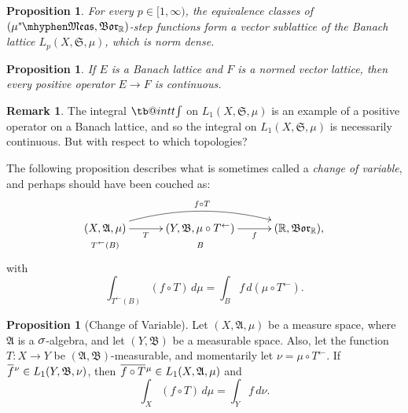 \documentclass[
twoside=true,
paper=letter,
fontsize=9pt,
pagesize=auto,
leqno,
openany,
headsepline,
overfullrule,
]{scrbook}
\makeatletter
\theoremstyle{plain}
\theoremstyle{plain}
\newtheorem{prop}[thm]{Proposition}
\theoremstyle{definition}
\newtheorem{rmk}[thm]{Remark}
\theoremstyle{bfnoteitalic}
\newtheorem{propboldnote}[thm]{Proposition}
\theoremstyle{bfnoteroman}
\newcommand{\sigalg}[1]{\mathfrak{#1}}
\newcommand{\borel}{\mathfrak{Bor}}
\newcommand{\textsigma}{\hbox{\large{$\sigma$}}\kern-1pt}
\newcommand{\preimage}[1]{#1^{\leftarrow}}
\newcommand{\R}{\mathbb{R}}
\newcommand{\semiring}{\sigalg{S}}
\newcommand{\sigmaalgebra}{\sigalg{A}}
\newcommand{\sigmaalgebraii}{\sigalg{B}}
\newcommand{\measurable}[1]{{#1}\mhyphen\mathfrak{Meas}}
\newcommand{\kernast}{\ast\kern-1pt}
\newcommand{\function}{f}
\newcommand{\measurespace}{X}
\newcommand{\measurespaceii}{Y}
\newcommand{\measure}{\mu}
\newcommand{\measureii}{\nu}
\newcommand{\setii}{B}
\newcommand*\xbar[1]{%
   \hbox{%
     \vbox{%
       \hrule height 0.4pt %
       \kern0.4ex%
       \hbox{%
         \ensuremath{#1}%
       }%
     }%
   }%
}
\newcommand\tint{\mathop{\mathpalette\tb@int{t}}\!\int}
\newcommand\tb@int[2]{%
  \sbox\z@{$\m@th#1\int$}%
  \if#2t%
    \rlap{\hbox to\wd\z@{%
      \hfil
      \vrule width .35em height \dimexpr\ht\z@+1.4pt\relax depth -\dimexpr\ht\z@+1pt\relax
      \kern.05em %
    }}
  \else
    \rlap{\hbox to\wd\z@{%
      \vrule width .35em height -\dimexpr\dp\z@+1pt\relax depth \dimexpr\dp\z@+1.4pt\relax
      \hfil
    }}
  \fi
}
\newcommand{\lebclass}[1]{\hspace{.5pt}\xbar{#1}\hspace{0.5pt}}
\newcommand{\ellclass}[2]{\lebclass{#1}^{#2}}
\newcommand{\inducedint}{\tint}
\makeatother
\begin{document}
\begin{prop}\label{step_functions_dense}
For every $p\in [1, \infty)$, the equivalence classes of $(\measurable{\measure^\kernast}, \borel_\R)$-step functions form a vector sublattice of the Banach lattice $L_p(\measurespace, \semiring, \measure)$, which is norm dense.
\end{prop}



\begin{prop}\label{integral_continuous}
If $E$ is a Banach lattice and $F$ is a normed vector lattice, then every positive operator $E\to F$ is continuous.
\end{prop}



\begin{rmk}
The integral $\inducedint$ on $L_1(\measurespace, \semiring, \measure)$ is an example of a positive operator on a Banach lattice, and so the integral on $L_1(\measurespace, \semiring, \measure)$ is necessarily continuous. But with respect to which topologies?
\end{rmk}







The following proposition describes what is sometimes called a \emph{change of variable}, and perhaps should have been couched as:
\[
\xymatrix@R=0pt@C=30pt{ 
(\measurespace,\sigmaalgebra,\measure)
\ar[r]_-{T} \ar@/^16pt/[rr]^{f\circ T}
& (\measurespaceii,\sigmaalgebraii,\measure\circ\preimage{T})
\ar[r]_-{\function}
& (\R,\borel_\R), \\
\scriptstyle{\preimage{T}(\setii)} & \scriptstyle{\setii} & \\
}
\]
with
\[
\int_{\preimage{T}(\setii)} (\function\circ T) \, d\measure
= \int_\setii \function \, d (\measure\circ\preimage{T}).
\]


\begin{propboldnote}[Change of Variable]\label{change_of_variable}
Let $(\measurespace,\sigmaalgebra,\measure)$ be a measure space, where $\sigmaalgebra$ is a $\textsigma$-algebra, and let $(\measurespaceii, \sigmaalgebraii)$ be a measurable space.  Also, let the function $T:\measurespace\to\measurespaceii$ be $(\sigmaalgebra, \sigmaalgebraii)$\hyp{}measurable, and momentarily let 
$\measureii = \measure\circ\preimage{T}$.
If
$\ellclass{\function}{\measureii} 
\in L_1(\measurespaceii, \sigmaalgebraii, \measureii)$, 
then 
$\ellclass{\function\circ T}{\measure}
\in
L_1(\measurespace, \sigmaalgebra, \measure)$
and
\[
\int_\measurespace (f\circ T) \, d\measure
= \int_\measurespaceii f \, d\measureii.
\]
\end{propboldnote}
\end{document}
